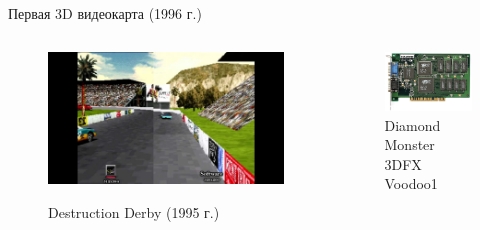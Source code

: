 \documentclass{beamer}
\begin{document}
\begin{frame}{Первая 3D видеокарта (1996 г.)}{}
	\begin{columns}
		\begin{column}{0.5\textwidth}
			
			\begin{figure}
				\href{https://www.youtube.com/watch?app=desktop&v=Zdf270cZD9g}{
				\includegraphics[width=\textwidth]{images/Destruction_Derby_1995.png}}
				\caption {Destruction Derby (1995 г.)}
			\end{figure}
		\end{column}
		\begin{column}{0.5\textwidth}
			\begin{figure} 
				\includegraphics[width=\textwidth]{images/Diamond_Monster_3D_3DFX_Voodoo1.png}
				\caption {Diamond Monster 3DFX Voodoo1}
			\end{figure}
		\end{column}
	\end{columns}
\end{frame}
\end{document}
